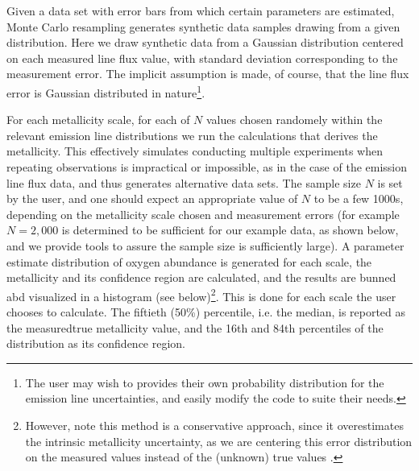 \documentclass{emulateapj}
\begin{document}
Given a data set with error bars from which certain parameters are estimated, Monte Carlo resampling generates synthetic data samples drawing from a given distribution. 
Here we draw synthetic data from a Gaussian distribution centered on each measured line flux value, with standard deviation corresponding to the measurement error. The implicit assumption is made, of course, that the line flux error is Gaussian distributed in nature\footnote{The user may wish to provides their own probability distribution for the emission line uncertainties, and easily modify the code to suite their needs.}. 

For each metallicity scale, for each of $N$  values chosen randomely within the relevant emission line distributions we run the calculations that derives the metallicity.
This effectively simulates conducting multiple experiments when repeating observations is impractical or impossible, as in the case of the emission line flux data, and thus generates alternative data sets. 
The sample size $N$ is set by the user, and one should expect an appropriate value of $N$ to be a few 1000s, depending on the metallicity scale chosen and measurement errors (for example  $N=2,000$ is determined to be sufficient for our example data, as shown below, and we provide tools to assure the sample size is sufficiently large). 
A parameter estimate distribution of oxygen abundance is generated for each scale, the metallicity and its confidence region are calculated,
and the results are bunned abd visualized in a histogram (see below)\footnote{However, note this method is a conservative approach, since it overestimates the intrinsic metallicity uncertainty, as we are centering this error distribution on the measured values instead of the (unknown) true values \citep{andrae10}.
}. This is done for each scale the user chooses to calculate. The fiftieth (50\%) percentile, i.e.  the median, is reported as the measuredtrue metallicity value, and the 16th and 84th percentiles of the distribution as its confidence region. %
\end{document}
